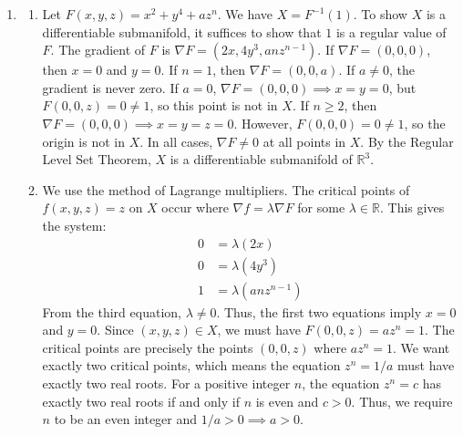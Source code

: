 \documentclass{article}
\begin{document}
\begin{enumerate}[label=\fbox{\arabic*}]
  \item %
        \begin{enumerate}[label=(\arabic*)]
          \item Let $F(x, y, z) = x^2 + y^4 + az^n$. We have $X = F^{-1}(1)$. To show $X$ is a differentiable submanifold, it suffices to show that $1$ is a regular value of $F$. The gradient of $F$ is $\nabla F = (2x, 4y^3, a n z^{n-1})$.
          If $\nabla F = (0, 0, 0)$, then $x = 0$ and $y = 0$.
          If $n = 1$, then $\nabla F = (0, 0, a)$. If $a \neq 0$, the gradient is never zero. If $a = 0$, $\nabla F = (0, 0, 0) \implies x = y = 0$, but $F(0, 0, z) = 0 \neq 1$, so this point is not in $X$.
          If $n \ge 2$, then $\nabla F = (0, 0, 0) \implies x = y = z = 0$. However, $F(0, 0, 0) = 0 \neq 1$, so the origin is not in $X$.
          In all cases, $\nabla F \neq 0$ at all points in $X$. By the Regular Level Set Theorem, $X$ is a differentiable submanifold of $\mathbb{R}^3$.
          \item We use the method of Lagrange multipliers. The critical points of $f(x,y,z) = z$ on $X$ occur where $\nabla f = \lambda \nabla F$ for some $\lambda \in \mathbb{R}$.
          This gives the system:
          \begin{align*}
            0 &= \lambda(2x) \\
            0 &= \lambda(4y^3) \\
            1 &= \lambda(an z^{n-1})
          \end{align*}
          From the third equation, $\lambda \neq 0$. Thus, the first two equations imply $x = 0$ and $y = 0$.
          Since $(x, y, z) \in X$, we must have $F(0, 0, z) = a z^n = 1$.
          The critical points are precisely the points $(0, 0, z)$ where $a z^n = 1$. We want exactly two critical points, which means the equation $z^n = 1/a$ must have exactly two real roots.
          For a positive integer $n$, the equation $z^n = c$ has exactly two real roots if and only if $n$ is even and $c > 0$.
          Thus, we require $n$ to be an even integer and $1/a > 0 \implies a > 0$.
        \end{enumerate}


\end{enumerate}
\end{document}
